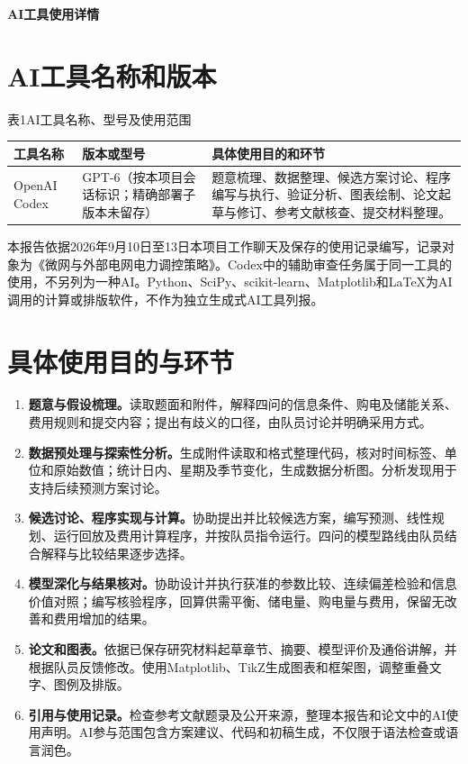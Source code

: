 \documentclass[UTF8,a4paper,12pt]{ctexart}
\begin{document}
\begin{center}\LARGE\bfseries AI工具使用详情\end{center}
\vspace{3pt}

\section{AI工具名称和版本}
\begin{center}
\small 表1\quad AI工具名称、型号及使用范围\par\vspace{5pt}
\renewcommand{\arraystretch}{1.35}
\begin{tabularx}{\linewidth}{@{}p{2.9cm}p{3.5cm}X@{}}
\toprule
工具名称 & 版本或型号 & 具体使用目的和环节\\
\midrule
OpenAI Codex & GPT-6（按本项目会话标识；精确部署子版本未留存） & 题意梳理、数据整理、候选方案讨论、程序编写与执行、验证分析、图表绘制、论文起草与修订、参考文献核查、提交材料整理。\\
\bottomrule
\end{tabularx}
\end{center}

本报告依据2026年9月10日至13日本项目工作聊天及保存的使用记录编写，记录对象为《微网与外部电网电力调控策略》。Codex中的辅助审查任务属于同一工具的使用，不另列为一种AI。Python、SciPy、scikit-learn、Matplotlib和LaTeX为AI调用的计算或排版软件，不作为独立生成式AI工具列报。

\section{具体使用目的与环节}
\begin{enumerate}[label=\arabic*、]
\item \textbf{题意与假设梳理。}读取题面和附件，解释四问的信息条件、购电及储能关系、费用规则和提交内容；提出有歧义的口径，由队员讨论并明确采用方式。
\item \textbf{数据预处理与探索性分析。}生成附件读取和格式整理代码，核对时间标签、单位和原始数值；统计日内、星期及季节变化，生成数据分析图。分析发现用于支持后续预测方案讨论。
\item \textbf{候选讨论、程序实现与计算。}协助提出并比较候选方案，编写预测、线性规划、运行回放及费用计算程序，并按队员指令运行。四问的模型路线由队员结合解释与比较结果逐步选择。
\item \textbf{模型深化与结果核对。}协助设计并执行获准的参数比较、连续偏差检验和信息价值对照；编写核验程序，回算供需平衡、储电量、购电量与费用，保留无改善和费用增加的结果。
\item \textbf{论文和图表。}依据已保存研究材料起草章节、摘要、模型评价及通俗讲解，并根据队员反馈修改。使用Matplotlib、TikZ生成图表和框架图，调整重叠文字、图例及排版。
\item \textbf{引用与使用记录。}检查参考文献题录及公开来源，整理本报告和论文中的AI使用声明。AI参与范围包含方案建议、代码和初稿生成，不仅限于语法检查或语言润色。
\end{enumerate}
\end{document}
